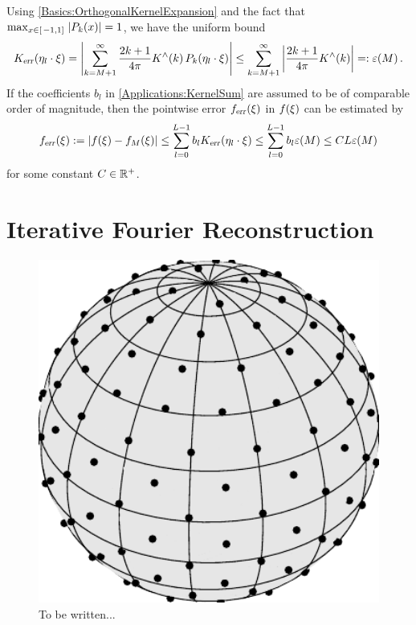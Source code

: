 Using \eqref{Basics:OrthogonalKernelExpansion} and the fact that $\max_{x \in \left[\left.-1,1\right]\right.} \left\vert P_{k}{\hspace{-0.4ex}}\left(x\right)\right\vert = 1$, we have the uniform bound
\[
  K_{\text{\textsl{err}}}{\hspace{-0.4ex}}\left(\mathbf{\eta}_{l} \cdot \mathbf{\xi}\right) 
  = \left\vert\sum_{k = M+1}^{\infty} \frac{2k+1}{4\pi} K^{\wedge}{\hspace{-0.4ex}}\left(k\right) P_k{\hspace{-0.4ex}}\left(\mathbf{\eta}_{l} \cdot \mathbf{\xi}\right)\right\vert 
  \le \sum_{k = M+1}^{\infty} \left\vert\frac{2k+1}{4\pi} K^{\wedge}{\hspace{-0.4ex}}\left(k\right)\right\vert =: \varepsilon{\hspace{-0.4ex}}\left(M\right).
\]
If the coefficients $b_{l}$ in \eqref{Applications:KernelSum} are assumed to be of comparable order of magnitude, then the pointwise error $f_{\text{\textsl{err}}}{\hspace{-0.4ex}}\left(\xi\right)$ in $f{\hspace{-0.4ex}}\left(\mathbf{\xi}\right)$ can be estimated by
\[
  f_{\text{\textsl{err}}}{\hspace{-0.4ex}}\left(\xi\right) := \left\vert f{\hspace{-0.4ex}}\left(\xi\right) - f_{M}{\hspace{-0.4ex}}\left(\xi\right)\right\vert 
  \le \sum_{l=0}^{L-1} b_{l} K_{\text{\textsl{err}}}{\hspace{-0.4ex}}\left(\mathbf{\eta}_{l} \cdot \mathbf{\xi}\right)
  \le \sum_{l=0}^{L-1} b_{l} \varepsilon{\hspace{-0.4ex}}\left(M\right)
  \le C L \varepsilon{\hspace{-0.4ex}}\left(M\right)
\]
for some constant $C \in \mathbb{R}^{+}$.

\section{Iterative Fourier Reconstruction}

\begin{figure}[tb]
  \centering
  \includegraphics[width=12cm]{images/healpix}
  \caption{To be written...}
  \label{healpix}
\end{figure}


